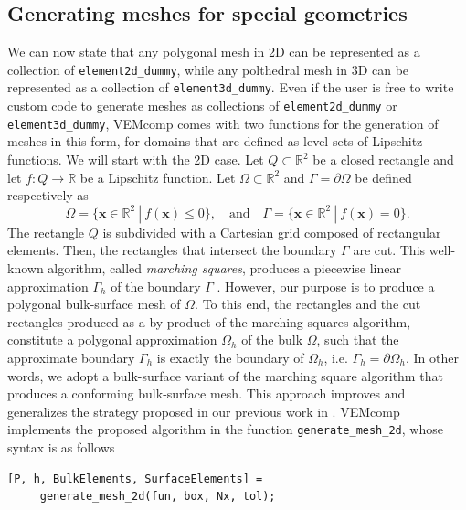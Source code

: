 \documentclass[a4paper]{article}
\newcommand{\boldx}{\boldsymbol{x}}
\begin{document}
\subsection{Generating meshes for special geometries}
\label{sec:mesh_generation}
We can now state that any polygonal mesh in 2D can be represented as a collection of \texttt{element2d\_dummy}, while any polthedral mesh in 3D can be represented as a collection of \texttt{element3d\_dummy}.  Even if the user is free to write custom code to generate meshes as collections of \texttt{element2d\_dummy} or \texttt{element3d\_dummy},  VEMcomp comes with two functions for the generation of meshes in this form, for domains that are defined as level sets of Lipschitz functions.  We will start with the 2D case. Let $Q \subset\mathbb{R}^2$ be a closed rectangle and let $f: Q \rightarrow\mathbb{R}$ be a Lipschitz function.  Let $\Omega \subset\mathbb{R}^2$ and $\Gamma = \partial \Omega$ be defined respectively as
\begin{equation}
\label{level_set_2d}
\Omega = \{\boldx\in\mathbb{R}^2\ |\ f(\boldx) \le 0\}, \quad \text{and}\quad \Gamma = \{\boldx\in\mathbb{R}^2\ |\ f(\boldx) = 0\}.
\end{equation}
The rectangle $Q$ is subdivided with a Cartesian grid composed of rectangular elements. Then, the rectangles that intersect the boundary $\Gamma$ are cut. This well-known algorithm,  called	\emph{marching squares}, produces a piecewise linear approximation $\Gamma_h$ of the boundary $\Gamma$ \cite{lorensen1987marching}. However, our purpose is to produce a polygonal bulk-surface mesh of $\Omega$. To this end,  the rectangles and the cut rectangles produced as a by-product of the marching squares algorithm, constitute a polygonal approximation $\Omega_h$ of the bulk $\Omega$, such that the approximate boundary $\Gamma_h$ is exactly the boundary of $\Omega_h$, i.e. $\Gamma_h = \partial \Omega_h$. In other words,  we adopt a bulk-surface variant of the marching square algorithm that produces a conforming bulk-surface mesh. This approach improves and generalizes the strategy proposed in our previous work in \cite{frittelli2021bulk}. VEMcomp implements the proposed algorithm in the function \texttt{generate\_mesh\_2d}, whose syntax is as follows
\begin{lstlisting}
[P, h, BulkElements, SurfaceElements] =
     generate_mesh_2d(fun, box, Nx, tol);
\end{lstlisting}
\end{document}
